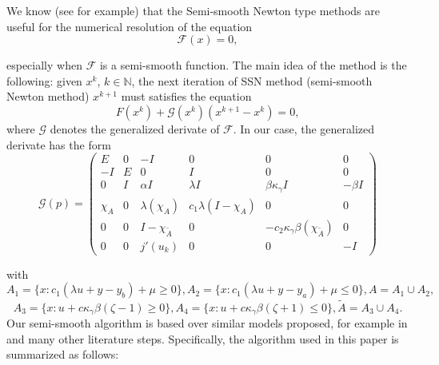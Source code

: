 \documentclass[11pt,a4paper]{amsart}
\begin{document}
We know (see for example\cite{ulbrich, meyer1, stadler}) that the Semi-smooth Newton type methods are useful for the numerical resolution of the equation
\begin{equation}\label{SSN}
     \mathcal{F}(x)=0,
\end{equation}   

especially when $\mathcal{F}$ is a semi-smooth function. The main idea of the method is the following: given $x^k$, $k\in \mathbb{N}$, the next iteration of SSN method (semi-smooth Newton method) $x^{k+1}$ must satisfies the equation
\[
F(x^k)+\mathcal{G}(x^k)(x^{k+1}-x^k)=0,
\]
where $\mathcal{G}$ denotes the generalized derivate of $\mathcal{F}$. In our case, the generalized derivate has the form 
\begin{equation}
    \mathcal{G}(p)=\begin{pmatrix}
    E               &0      &   -I                  &0                       &0                                           &0\\
    -I              &E      &   0                   &I                       &0                                           &0\\
    0               &I      & \alpha I              &\lambda I               &\beta\kappa_{\gamma}I                       &-\beta I\\
    \chi_{A}        &0      & \lambda(\chi_{A})     &c_1\lambda(I-\chi_{A})    &0                                           &0\\
    0               &0      &   I-\chi_{\tilde{A}}  &0                       &-c_2\kappa_{\gamma}\beta(\chi_{\tilde{A}})    &0\\
    0               &0      &   j'(u_k)             &0                       &   0                                        &-I
    \end{pmatrix}
\end{equation}

with 
\[
    A_1=\{x: c_1(\lambda u+y-y_b)+\mu\ge 0\}, A_2=\{x: c_1(\lambda u+y-y_a)+\mu \le 0\}, A=A_1\cup A_2,
\]
\[
    A_3=\{x:u+c\kappa_{\gamma}\beta(\zeta-1)\ge 0\},  A_4=\{x:u+c\kappa_{\gamma}\beta(\zeta+1)\le 0\},  \tilde{A}=A_3\cup A_4.
\]
Our semi-smooth algorithm is based over similar models proposed, for example in \cite{ulbrich, stadler, meyer1} and many other literature steps. Specifically, the algorithm used in this paper is summarized as follows:  \\
\end{document}
